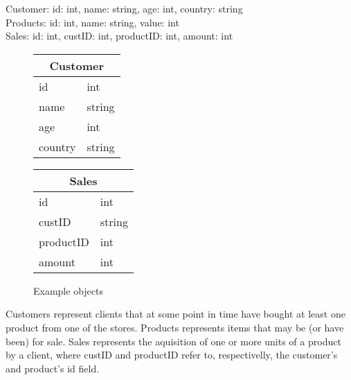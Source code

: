 \documentclass{vldb}
\begin{document}
Customer: id: int, name: string, age: int, country: string \\
Products: id: int, name: string, value: int \\
Sales: id: int, custID: int, productID: int, amount: int \\

\begin{figure}
	\centering
	\begin{tabular}{|l|l|}
		\multicolumn{2}{c}{Customer} \\ \hline
		id            & int          \\ \hline
		name          & string       \\ \hline
		age           & int          \\ \hline
		country       & string      \\
		\hline
	\end{tabular} \hspace{0.7em}
	 \hspace{0.7em}
	\begin{tabular}{|l|l|}
		\multicolumn{2}{c}{Sales} \\ \hline
		id            & int       \\ \hline
		custID        & string    \\ \hline
		productID     & int       \\ \hline
		amount        & int	\\
		\hline      
	\end{tabular}
	\caption{Example objects}
	\label{fig:objects}
\end{figure}

Customers represent clients that at some point in time have bought at least one product from one of the stores.
Products represents items that may be (or have been) for sale.
Sales represents the aquisition of one or more units of a product by a client, where custID and productID refer to, respectivelly, the customer's and product's id field.
\end{document}
